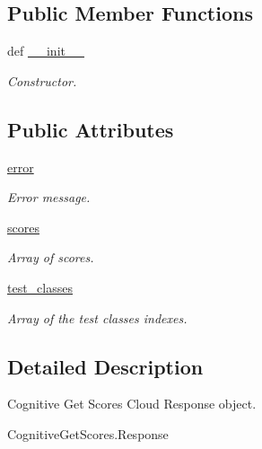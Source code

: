 \subsection*{Public Member Functions}
\begin{DoxyCompactItemize}
\item 
def \hyperlink{classRappCloud_1_1CloudMsgs_1_1CognitiveGetScores_1_1CognitiveGetScores_1_1Response_a7475eb9ce7225341b1a0ce047f43fc01}{\-\_\-\-\_\-init\-\_\-\-\_\-}
\begin{DoxyCompactList}\small\item\em Constructor. \end{DoxyCompactList}\end{DoxyCompactItemize}
\subsection*{Public Attributes}
\begin{DoxyCompactItemize}
\item 
\hyperlink{classRappCloud_1_1CloudMsgs_1_1CognitiveGetScores_1_1CognitiveGetScores_1_1Response_a460b46f925b317c7f2da82bc77f5f133}{error}
\begin{DoxyCompactList}\small\item\em Error message. \end{DoxyCompactList}\item 
\hyperlink{classRappCloud_1_1CloudMsgs_1_1CognitiveGetScores_1_1CognitiveGetScores_1_1Response_a8ca305f7e408593de6aca72cf14adb83}{scores}
\begin{DoxyCompactList}\small\item\em Array of scores. \end{DoxyCompactList}\item 
\hyperlink{classRappCloud_1_1CloudMsgs_1_1CognitiveGetScores_1_1CognitiveGetScores_1_1Response_ad11c42b639516bcbb2469f13f5d5b0d7}{test\-\_\-classes}
\begin{DoxyCompactList}\small\item\em Array of the test classes indexes. \end{DoxyCompactList}\end{DoxyCompactItemize}


\subsection{Detailed Description}
\begin{DoxyVerb}Cognitive Get Scores Cloud Response object.

CognitiveGetScores.Response
\end{DoxyVerb}
 

